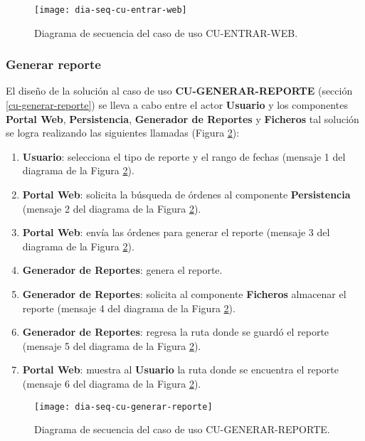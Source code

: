 \begin{figure}[h]
	\centering
	\texttt{[image: dia-seq-cu-entrar-web]}
	\caption{Diagrama de secuencia del caso de uso CU-ENTRAR-WEB.}
	\label{fig:dia-seq-cu-entrar-web}
\end{figure}

\subsubsection{Generar reporte}
El diseño de la solución al caso de uso \textbf{CU-GENERAR-REPORTE} (sección \ref{cu-generar-reporte}) se lleva a cabo entre el actor \textbf{Usuario} y los componentes \textbf{Portal Web}, \textbf{Persistencia}, \textbf{Generador de Reportes} y \textbf{Ficheros} tal solución se logra realizando las siguientes llamadas (Figura \ref{fig:dia-seq-cu-generar-reporte}):
\begin{enumerate}
	\item \textbf{Usuario}: selecciona el tipo de reporte y el rango de fechas (mensaje 1 del diagrama de la Figura \ref{fig:dia-seq-cu-generar-reporte}).
	\item \textbf{Portal Web}: solicita la búsqueda de órdenes al componente \textbf{Persistencia} (mensaje 2 del diagrama de la Figura \ref{fig:dia-seq-cu-generar-reporte}).
	\item \textbf{Portal Web}: envía las órdenes para generar el reporte (mensaje 3 del diagrama de la Figura \ref{fig:dia-seq-cu-generar-reporte}).
	\item \textbf{Generador de Reportes}: genera el reporte.
	\item \textbf{Generador de Reportes}: solicita al componente \textbf{Ficheros} almacenar el reporte (mensaje 4 del diagrama de la Figura \ref{fig:dia-seq-cu-generar-reporte}).
	\item \textbf{Generador de Reportes}: regresa la ruta donde se guardó el reporte (mensaje 5 del diagrama de la Figura \ref{fig:dia-seq-cu-generar-reporte}).
	\item \textbf{Portal Web}: muestra al \textbf{Usuario} la ruta donde se encuentra el reporte (mensaje 6 del diagrama de la Figura \ref{fig:dia-seq-cu-generar-reporte}).
\end{enumerate}

\begin{figure}[h]
	\centering
	\texttt{[image: dia-seq-cu-generar-reporte]}
	\caption{Diagrama de secuencia del caso de uso CU-GENERAR-REPORTE.}
	\label{fig:dia-seq-cu-generar-reporte}
\end{figure}


